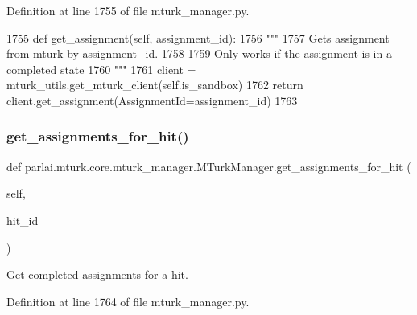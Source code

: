 Definition at line 1755 of file mturk\+\_\+manager.\+py.


\begin{DoxyCode}
1755     \textcolor{keyword}{def }get\_assignment(self, assignment\_id):
1756         \textcolor{stringliteral}{"""}
1757 \textcolor{stringliteral}{        Gets assignment from mturk by assignment\_id.}
1758 \textcolor{stringliteral}{}
1759 \textcolor{stringliteral}{        Only works if the assignment is in a completed state}
1760 \textcolor{stringliteral}{        """}
1761         client = mturk\_utils.get\_mturk\_client(self.is\_sandbox)
1762         \textcolor{keywordflow}{return} client.get\_assignment(AssignmentId=assignment\_id)
1763 
\end{DoxyCode}
\mbox{\label{classparlai_1_1mturk_1_1core_1_1mturk__manager_1_1MTurkManager_a87d3096941e232227de762b3a8260f3d}} 
\subsubsection{\texorpdfstring{get\+\_\+assignments\+\_\+for\+\_\+hit()}{get\_assignments\_for\_hit()}}
{\footnotesize\ttfamily def parlai.\+mturk.\+core.\+mturk\+\_\+manager.\+M\+Turk\+Manager.\+get\+\_\+assignments\+\_\+for\+\_\+hit (\begin{DoxyParamCaption}\item[{}]{self,  }\item[{}]{hit\+\_\+id }\end{DoxyParamCaption})}

\begin{DoxyVerb}Get completed assignments for a hit.
\end{DoxyVerb}
 

Definition at line 1764 of file mturk\+\_\+manager.\+py.


